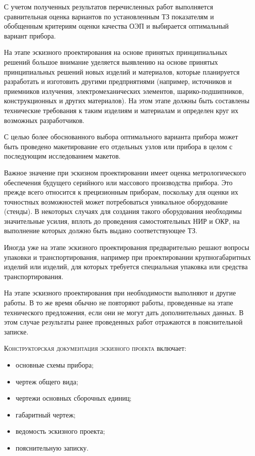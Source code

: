 С учетом полученных результатов перечисленных работ выполняется сравнительная оценка вариантов по установленным ТЗ показателям и обобщенным критериям оценки качества ОЭП и выбирается оптимальный вариант прибора.

На этапе эскизного проектирования на основе принятых принципиальных решений большое внимание уделяется выявлению на основе принятых принципиальных решений новых изделий и материалов, которые планируется разработать и изготовить другими предприятиями (например, источников и приемников излучения, электромеханических элементов, шарико-подшипников, конструкционных и других материалов). На этом этапе должны быть составлены технические требования к таким изделиям и материалам и определен круг их возможных разработчиков.

С целью более обоснованного выбора оптимального варианта прибора может быть проведено макетирование его отдельных узлов или прибора в целом с последующим исследованием макетов.

Важное значение при эскизном проектировании имеет оценка метрологического обеспечения будущего серийного или массового производства прибора. Это прежде всего относится к прецизионным приборам, поскольку для оценки их точностных возможностей может потребоваться уникальное оборудование (стенды). В некоторых случаях для создания такого оборудования необходимы значительные усилия, вплоть до проведения самостоятельных НИР и ОКР, на выполнение которых должно быть выдано соответствующее ТЗ.

Иногда уже на этапе эскизного проектирования предварительно решают вопросы упаковки и транспортирования, например при проектировании крупногабаритных изделий или изделий, для которых требуется специальная упаковка или средства транспортирования.

На этапе эскизного проектирования при необходимости выполняют и другие работы. В то же время обычно не повторяют работы, проведенные на этапе технического предложения, если они не могут дать дополнительных данных. В этом случае результаты ранее проведенных работ отражаются в пояснительной записке.

\textsc{Конструкторская документация эскизного проекта} включает:
\begin{itemize}
	\item основные схемы прибора;
	\item чертеж общего вида;
	\item чертежи основных сборочных единиц;
	\item габаритный чертеж;
	\item ведомость эскизного проекта;
	\item пояснительную записку.
\end{itemize} 

